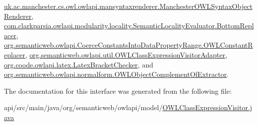 \hyperlink{classuk_1_1ac_1_1manchester_1_1cs_1_1owl_1_1owlapi_1_1mansyntaxrenderer_1_1_manchester_o_w_l_syntax_object_renderer_ad959d685a35bfc767b49b2c99750cf8e}{uk.\-ac.\-manchester.\-cs.\-owl.\-owlapi.\-mansyntaxrenderer.\-Manchester\-O\-W\-L\-Syntax\-Object\-Renderer}, \hyperlink{classcom_1_1clarkparsia_1_1owlapi_1_1modularity_1_1locality_1_1_semantic_locality_evaluator_1_1_bottom_replacer_a90378a7dad53cba397aa5088fb0d853d}{com.\-clarkparsia.\-owlapi.\-modularity.\-locality.\-Semantic\-Locality\-Evaluator.\-Bottom\-Replacer}, \hyperlink{classorg_1_1semanticweb_1_1owlapi_1_1_coerce_constants_into_data_property_range_1_1_o_w_l_constant_replacer_a3bc722be727e213e6f674f5adade63b2}{org.\-semanticweb.\-owlapi.\-Coerce\-Constants\-Into\-Data\-Property\-Range.\-O\-W\-L\-Constant\-Replacer}, \hyperlink{classorg_1_1semanticweb_1_1owlapi_1_1util_1_1_o_w_l_class_expression_visitor_adapter_a8b8354a7f34d58e21f53e658f1101424}{org.\-semanticweb.\-owlapi.\-util.\-O\-W\-L\-Class\-Expression\-Visitor\-Adapter}, \hyperlink{classorg_1_1coode_1_1owlapi_1_1latex_1_1_latex_bracket_checker_a2e03c7b81560f7e8c2a789906f8e740e}{org.\-coode.\-owlapi.\-latex.\-Latex\-Bracket\-Checker}, and \hyperlink{classorg_1_1semanticweb_1_1owlapi_1_1normalform_1_1_o_w_l_object_complement_of_extractor_a479a253e38b587a22a95039ba7d7d8f1}{org.\-semanticweb.\-owlapi.\-normalform.\-O\-W\-L\-Object\-Complement\-Of\-Extractor}.



The documentation for this interface was generated from the following file\-:\begin{DoxyCompactItemize}
\item 
api/src/main/java/org/semanticweb/owlapi/model/\hyperlink{_o_w_l_class_expression_visitor_8java}{O\-W\-L\-Class\-Expression\-Visitor.\-java}\end{DoxyCompactItemize}
